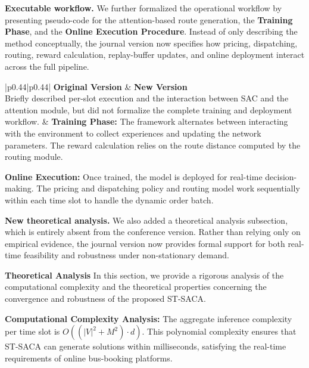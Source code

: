\documentclass[11pt, a4paper]{article}
\begin{document}
\begin{itemize}
    \textbf{Executable workflow.} We further formalized the operational workflow by presenting pseudo-code for the attention-based route generation, the \textbf{Training Phase}, and the \textbf{Online Execution Procedure}. Instead of only describing the method conceptually, the journal version now specifies how pricing, dispatching, routing, reward calculation, replay-buffer updates, and online deployment interact across the full pipeline.
    
    \begin{tabular}{|p{0.44\textwidth}|p{0.44\textwidth}|}
        \hline
        \textbf{Original Version} & \textbf{New Version}\\
        \hline
        Briefly described per-slot execution and the interaction between SAC and the attention module, but did not formalize the complete training and deployment workflow.
        &
        \textbf{Training Phase:} The framework alternates between interacting with the environment to collect experiences and updating the network parameters. The reward calculation relies on the route distance computed by the routing module.

        \textbf{Online Execution:} Once trained, the model is deployed for real-time decision-making. The pricing and dispatching policy and routing model work sequentially within each time slot to handle the dynamic order batch.\\
        \hline
        \end{tabular}

    \textbf{New theoretical analysis.} We also added a theoretical analysis subsection, which is entirely absent from the conference version. Rather than relying only on empirical evidence, the journal version now provides formal support for both real-time feasibility and robustness under non-stationary demand.
    
    \begin{boxedminipage}[htbp]{\linewidth}
    \vspace{2mm}
    \textbf{Theoretical Analysis}
    In this section, we provide a rigorous analysis of the computational complexity and the theoretical properties concerning the convergence and robustness of the proposed ST-SACA.
    
    \textbf{Computational Complexity Analysis:} The aggregate inference complexity per time slot is $O((|V|^2 + M^2) \cdot d)$. This polynomial complexity ensures that ST-SACA can generate solutions within milliseconds, satisfying the real-time requirements of online bus-booking platforms.
    

\end{boxedminipage}
\end{itemize}
\end{document}
